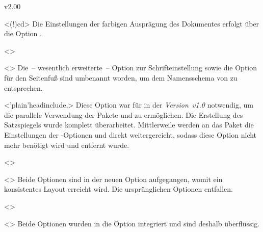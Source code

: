 \begin{Entity}{}
\begin{NoIndexDefault}
\begin{Cessations}{v2.00}
\begin{Cessation}
  {}
  <\Option(!){cd}>
\printdeclarationlist
%
Die Einstellungen der farbigen Ausprägung des Dokumentes erfolgt über die 
Option .
\end{Cessation}

\begin{Cessation}
  {}
  <>
\begin{Cessation}
  {}
  <>
\printdeclarationlist
%
Die~-- wesentlich erweiterte~-- Option zur Schrifteinstellung sowie die Option 
für den Seitenfuß sind umbenannt worden, um dem Namensschema von \TUDScript zu 
entsprechen.
\end{Cessation}
\end{Cessation}

\begin{Cessation}
  {}
  <\Option'plain'{headinclude},>
\printdeclarationlist
%
Diese Option war für \TUDScript in der \emph{Version~v1.0} notwendig, um die 
parallele Verwendung der Pakete  und  zu 
ermöglichen. Die Erstellung des Satzspiegels wurde komplett überarbeitet. 
Mittlerweile werden an das Paket  die Einstellungen der 
\KOMAScript-Optionen  und  direkt 
weitergereicht, sodass diese Option nicht mehr benötigt wird und entfernt wurde.
\end{Cessation}

\begin{Cessation}
  {}
  <>
\begin{Cessation}
  {}
  <>
\printdeclarationlist
%
Beide Optionen sind in der neuen Option  
aufgegangen, womit ein konsistentes Layout erreicht wird. Die ursprünglichen 
Optionen entfallen. 
\end{Cessation}
\end{Cessation}

\begin{Cessation}
  {}
  <>
\begin{Cessation}
  {}
  <>
\printdeclarationlist
%
Beide Optionen wurden in die Option  integriert und sind 
deshalb überflüssig.
\end{Cessation}
\end{Cessation}


\end{Cessations}
\end{NoIndexDefault}
\end{Entity}
